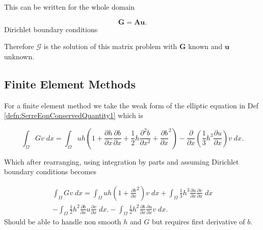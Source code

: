 This can be written for the whole domain 

\begin{equation*}
\boldsymbol{G} = \boldsymbol{A}
\boldsymbol{u}.
\end{equation*}
Dirichlet boundary conditions

Therefore $\mathcal{G}$ is the solution of this matrix problem with $\boldsymbol{G}$ known and $\boldsymbol{u}$ unknown. 

\subsection{Finite Element Methods}
For a finite element method we take the weak form of the elliptic equation in Def \ref{defn:SerreEqnConservedQuantity1} which is 

	\[ \int_{\Omega } G v \; dx =  \int_{\Omega } uh \left(1 + \frac{\partial h}{\partial x}\frac{\partial b}{\partial x} + \frac{1}{2}h\frac{\partial^2 b}{\partial x^2} + \frac{\partial b}{\partial x}^2 \right) - \frac{\partial}{\partial x}\left(\frac{1}{3}h^3  \frac{\partial {u}}{\partial x}\right) v \; dx.\]
	
Which after rearranging, using integration by parts and assuming Dirichlet boundary conditions becomes



\begin{multline}
\int_{\Omega } G v \; dx = \int_{\Omega } uh \left(1 + \frac{\partial b}{\partial x}^2 \right) v \; dx +  \int_{\Omega } \frac{1}{3}h^3  \frac{\partial {u}}{\partial x} \frac{\partial v}{\partial x} \; dx  \\ - 
\int_{\Omega }   \frac{1}{2}h^2\frac{\partial b}{\partial x} u \frac{\partial v }{\partial x}\; dx. - 
\int_{\Omega }   \frac{1}{2}h^2\frac{\partial b}{\partial x}  \frac{\partial u }{\partial x}v \; dx.
\end{multline}
Should be able to handle non smooth $h$ and $G$ but requires first derivative of $b$.



